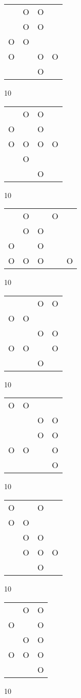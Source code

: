 \begin{tabular}{|m{0.2cm}m{0.2cm}m{0.2cm}m{0.2cm}|}\hline
 &O&O& \\
 &O&O& \\
O&O& & \\
O& &O&O\\
 & &O& \\
\hline\end{tabular}10
\begin{tabular}{|m{0.2cm}m{0.2cm}m{0.2cm}m{0.2cm}|}\hline
 &O&O& \\
O& &O& \\
O&O&O&O\\
 &O& & \\
 & &O& \\
\hline\end{tabular}10
\begin{tabular}{|m{0.2cm}m{0.2cm}m{0.2cm}m{0.2cm}m{0.2cm}|}\hline
 &O& &O& \\
 &O&O& & \\
O& &O& & \\
O&O&O& &O\\
\hline\end{tabular}10
\begin{tabular}{|m{0.2cm}m{0.2cm}m{0.2cm}m{0.2cm}|}\hline
 & &O&O\\
O&O& & \\
 & &O&O\\
O&O& &O\\
 & &O& \\
\hline\end{tabular}10
\begin{tabular}{|m{0.2cm}m{0.2cm}m{0.2cm}m{0.2cm}|}\hline
O&O& & \\
 & &O&O\\
 & &O&O\\
O&O& &O\\
 & & &O\\
\hline\end{tabular}10
\begin{tabular}{|m{0.2cm}m{0.2cm}m{0.2cm}m{0.2cm}|}\hline
O& &O& \\
O&O& & \\
 &O&O& \\
 &O&O&O\\
 & &O& \\
\hline\end{tabular}10
\begin{tabular}{|m{0.2cm}m{0.2cm}m{0.2cm}|}\hline
 &O&O\\
O& &O\\
 &O&O\\
O&O&O\\
 & &O\\
\hline\end{tabular}10
